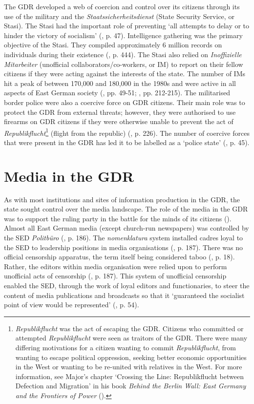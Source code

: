 The GDR developed a web of coercion and control over its citizens through its use of the military and the \textit{Staatssicherheitsdienst} (State Security Service, or Stasi). The Stasi had the important role of preventing ‘all attempts to delay or to hinder the victory of socialism’ (\cite{fullbrook1995}, p. 47). Intelligence gathering was the primary objective of the Stasi. They compiled approximately 6 million records on individuals during their existence (\cite{schroeder1998}, p. 444). The Stasi also relied on \textit{Inoffizielle Mitarbeiter} (unofficial collaborators/co-workers, or IM) to report on their fellow citizens if they were acting against the interests of the state. The number of IMs hit a peak of between 170,000 and 180,000 in the 1980s and were active in all aspects of East German society (\cite{fullbrook1995}, pp. 49-51; \cite{dennis2000}, pp. 212-215). The militarised border police were also a coercive force on GDR citizens. Their main role was to protect the GDR from external threats; however, they were authorised to use firearms on GDR citizens if they were otherwise unable to prevent the act of \textit{Republikflucht}\footnote{\textit{Republikflucht} was the act of escaping the GDR. Citizens who committed or attempted \textit{Republikflucht} were seen as traitors of the GDR. There were many differing motivations for a citizen wanting to commit \textit{Republikflucht}, from wanting to escape political oppression, seeking better economic opportunities in the West or wanting to be re-united with relatives in the West. For more information, see Major’s chapter ‘Crossing the Line: Republikflucht between Defection and Migration’ in his book \textit{Behind the Berlin Wall: East Germany and the Frontiers of Power} (\cite{major2009}).} (flight from the republic) (\cite{dennis2000}, p. 226). The number of coercive forces that were present in the GDR has led it to be labelled as a ‘police state’ (\cite{fullbrook1995}, p. 45).

\section*{Media in the GDR}

As with most institutions and sites of information production in the GDR, the state sought control over the media landscape. The role of the media in the GDR was to support the ruling party in the battle for the minds of its citizens (\cite{meyenfiedler2013}). Almost all East German media (except church-run newspapers) was controlled by the SED \textit{Politbüro} (\cite{vonharpe1997}, p. 186). The \textit{nomenklatura} system installed cadres loyal to the SED to leadership positions in media organisations (\cite{vonharpe1997}, p. 187). There was no official censorship apparatus, the term itself being considered taboo (\cite{jäger1993}, p. 18). Rather, the editors within media organisation were relied upon to perform unofficial acts of censorship (\cite{vonharpe1997}, p. 187). This system of unofficial censorship enabled the SED, through the work of loyal editors and functionaries, to steer the content of media publications and broadcasts so that it ‘guaranteed the socialist point of view would be represented’ (\cite{costabile-heming2000}, p. 54).


